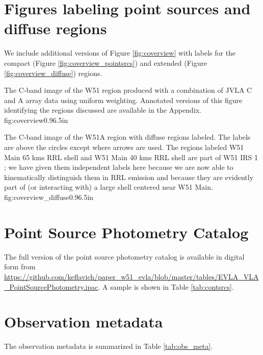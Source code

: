 

\appendix
\section{Figures labeling point sources and diffuse regions}
\label{sec:appendix_labels}
We include additional versions of Figure \ref{fig:coverview} with labels for
the compact (Figure \ref{fig:coverview_pointsrcs}) and extended (Figure
\ref{fig:coverview_diffuse}) \hii regions.

{The C-band image of the W51 region produced with a combination of JVLA
C and A array data using uniform weighting.  Annotated versions of this figure
identifying the regions discussed are available in the Appendix.}
{fig:coverview}{0.9}{6.5in}


{The C-band image of the W51A region with diffuse \hii regions labeled.  The labels
are above the circles except where arrows are used.  The regions labeled
{W51 Main 65 kms RRL shell} and {W51 Main 40 kms RRL shell} are part of  W51
IRS 1 \citep[e.g.,][]{Zhang1997a}; we have given them independent labels here
because we are now able to kinematically
distinguish them in RRL emission and because they are evidently part of (or
interacting with) a large shell centered near W51 Main.}
{fig:coverview_diffuse}{0.9}{6.5in}

%

\clearpage
\section{Point Source Photometry Catalog}
\label{sec:SEDs}
The full version of the point source photometry catalog is available in digital
form from
\url{https://github.com/keflavich/paper_w51_evla/blob/master/tables/EVLA_VLA_PointSourcePhotometry.ipac}.
A sample is shown in Table \ref{tab:contsrcs}.

%

\section{Observation metadata}
\label{sec:obsmeta}
The observation metadata is summarized in Table \ref{tab:obs_meta}.




